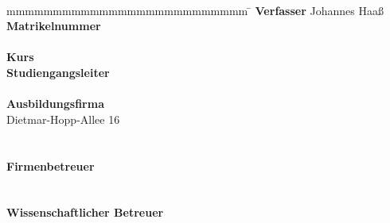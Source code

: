 \begin{titlepage}
\begin{center}
	 	  \vspace*{5mm}	\zeitraum\\
	\end{center}
	\vfill
	\begin{spacing}{1}
	\begin{tabbing}
		mmmmmmmmmmmmmmmmmmmmmmmmmm     \= \kill
		\textbf{Verfasser}		\> Johannes Haaß\\
		\textbf{Matrikelnummer}  \>  \martrikelnr\\
		\\
		\textbf{Kurs}  					\> \kurs\\
		\textbf{Studiengangsleiter}	   \>	\studiengangsleiter\\
		\\
		\textbf{Ausbildungsfirma}      \>  \firma\\
									\> Dietmar-Hopp-Allee 16\\
									\> \firmenort\\
									\\
		\textbf{Firmenbetreuer}              \>  \betreuer \\
										\>\betreuermail\\
										\\
		\textbf{Wissenschaftlicher Betreuer}             \>  \gutachter \\
										\>\gutachtermail\\
	\end{tabbing}
	\end{spacing}
\end{titlepage}
